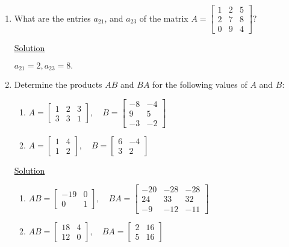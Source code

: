 \begin{enumerate}
\item What are the entries $a_{21}$, and $a_{23}$ of the matrix
$A = \begin{bmatrix}
1 & 2 & 5 \\
2 & 7 & 8 \\
0 & 9 & 4
\end{bmatrix}?$

\underline{Solution}

$a_{21} = 2, a_{23} = 8.$

\item Determine the products $AB$ and $BA$ for the following values of $A$ and
$B$:
\begin{enumerate}
\item $A = \begin{bmatrix}
1 & 2 & 3 \\
3 & 3 & 1
\end{bmatrix}, \quad 
B = \left[
\begin{array}{rr}
-8 & -4 \\
9 & 5 \\
-3 & -2
\end{array} \right]$

\item $A = \begin{bmatrix}
1 & 4 \\
1 & 2
\end{bmatrix}, \quad 
B = \left[
\begin{array}{rr}
6 & -4 \\
3 & 2
\end{array} \right]$
\end{enumerate}

\underline{Solution}

\begin{enumerate}
\item $AB = \left[
\begin{array}{rr}
-19 & 0 \\
0 & 1
\end{array} \right], \quad
BA = \left[
\begin{array}{rrr}
-20 & -28 & -28\\
24 & 33 & 32\\
-9 & -12 & -11
\end{array} \right]$

\item $AB = \left[
\begin{array}{rr}
18 & 4 \\
12 & 0
\end{array} \right], \quad
BA = \left[
\begin{array}{rr}
2 & 16 \\
5 & 16
\end{array} \right]$
\end{enumerate}


\end{enumerate}
